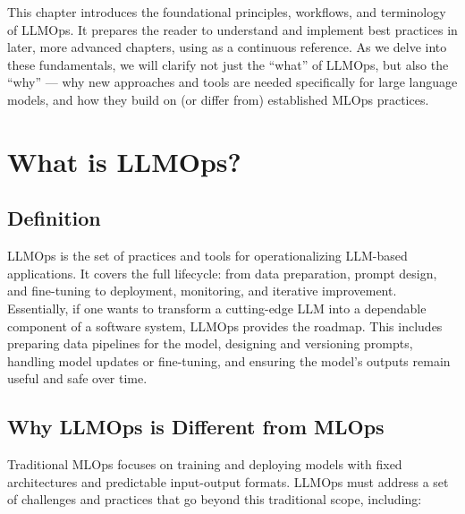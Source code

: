 This chapter introduces the foundational principles, workflows, and terminology of LLMOps. It prepares the reader to understand and implement best practices in later, more advanced chapters, using \ishtar{} as a continuous reference. As we delve into these fundamentals, we will clarify not just the ``what'' of LLMOps, but also the ``why'' — why new approaches and tools are needed specifically for large language models, and how they build on (or differ from) established MLOps practices.

\section{What is LLMOps?}
\label{sec:ch2-what-is-llmops}
\subsection{Definition}
LLMOps is the set of practices and tools for operationalizing LLM-based applications. It covers the full lifecycle: from data preparation, prompt design, and fine-tuning to deployment, monitoring, and iterative improvement. Essentially, if one wants to transform a cutting-edge LLM into a dependable component of a software system, LLMOps provides the roadmap. This includes preparing data pipelines for the model, designing and versioning prompts, handling model updates or fine-tuning, and ensuring the model's outputs remain useful and safe over time.

\subsection{Why LLMOps is Different from MLOps}
Traditional MLOps focuses on training and deploying models with fixed architectures and predictable input-output formats. LLMOps must address a set of challenges and practices that go beyond this traditional scope, including:

